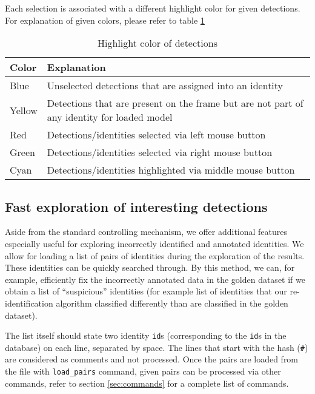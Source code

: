 Each selection is associated with a different highlight color for given detections.
For explanation of given colors, please refer to table \ref{tab:annotation_highlight}

\begin{table}[]
    \centering
    \begin{tabularx}{\textwidth}{l|X}
         \textbf{Color} & \textbf{Explanation} \\ \hline
         Blue & Unselected detections that are assigned into an identity \\ \hline
         Yellow & Detections that are present on the frame but are not part of any
         identity for loaded model \\ \hline
         Red & Detections/identities selected via left mouse button \\ \hline
         Green & Detections/identities selected via right mouse button \\ \hline
         Cyan & Detections/identities highlighted via middle mouse button \\
    \end{tabularx}
    \caption{Highlight color of detections}
    \label{tab:annotation_highlight}
\end{table}

\subsection{Fast exploration of interesting detections}

\label{subsec:exploration}

Aside from the standard controlling mechanism, we offer additional features especially
useful for exploring incorrectly identified and annotated identities. We allow
for loading a list of pairs of identities during the exploration of the results. These
identities can be quickly searched through. By this method, we can, for example, efficiently fix the incorrectly annotated data in the golden dataset if we obtain a list of ``suspicious'' identities (for example list of identities that our re-identification algorithm classified differently than are classified in the golden dataset).

The list itself should state two identity \verb+id+s (corresponding to the \verb+id+s in the
database) on each line, separated by space. The lines that start with the hash (\verb+#+) are considered as comments and not processed. Once the pairs are loaded
from the file with \verb+load_pairs+ command, given pairs can be processed via other
commands, refer to section \ref{sec:commands} for a complete list of commands.

